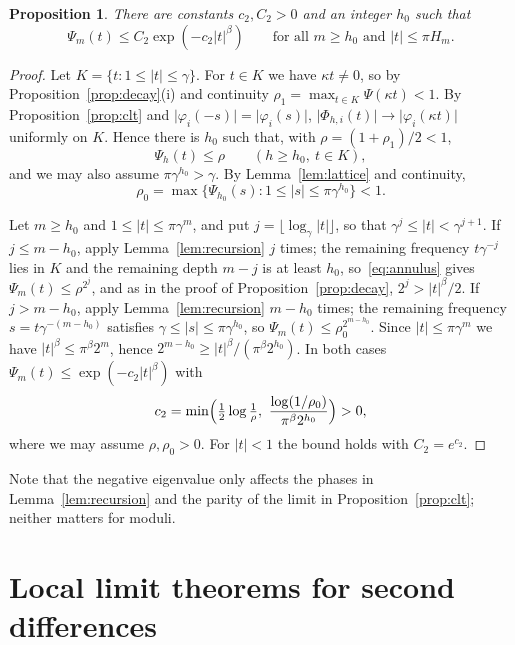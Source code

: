 \documentclass{amsart}
\newtheorem{proposition}[theorem]{Proposition}
\theoremstyle{definition}
\theoremstyle{remark}
\numberwithin{equation}{section}
\newcommand{\abs}[1]{\lvert #1\rvert}
\begin{document}
\begin{proposition}\label{prop:uniformdecay}
There are constants $c_2,C_2>0$ and an integer $h_0$ such that
\[
\Psi_m(t)\le C_2\exp(-c_2\abs t^\beta)\qquad\text{for all } m\ge h_0 \text{ and } \abs t\le\pi H_m .
\]
\end{proposition}

\begin{proof}
Let $K=\{t:1\le\abs t\le\gamma\}$. For $t\in K$ we have $\kappa t\ne0$, so by Proposition~\ref{prop:decay}(i) and continuity $\rho_1=\max_{t\in K}\Psi(\kappa t)<1$. By Proposition~\ref{prop:clt} and $\abs{\varphi_i(-s)}=\abs{\varphi_i(s)}$, $\abs{\Phi_{h,i}(t)}\to\abs{\varphi_i(\kappa t)}$ uniformly on $K$. Hence there is $h_0$ such that, with $\rho=(1+\rho_1)/2<1$,
\begin{equation}\label{eq:annulus}
\Psi_h(t)\le\rho\qquad(h\ge h_0,\ t\in K),
\end{equation}
and we may also assume $\pi\gamma^{h_0}>\gamma$. By Lemma~\ref{lem:lattice} and continuity,
\[
\rho_0=\max\bigl\{\Psi_{h_0}(s):1\le\abs s\le\pi\gamma^{h_0}\bigr\}<1 .
\]

Let $m\ge h_0$ and $1\le\abs t\le\pi\gamma^m$, and put $j=\lfloor\log_\gamma\abs t\rfloor$, so that $\gamma^j\le\abs t<\gamma^{j+1}$. If $j\le m-h_0$, apply Lemma~\ref{lem:recursion} $j$ times; the remaining frequency $t\gamma^{-j}$ lies in $K$ and the remaining depth $m-j$ is at least $h_0$, so~\eqref{eq:annulus} gives $\Psi_m(t)\le\rho^{2^j}$, and as in the proof of Proposition~\ref{prop:decay}, $2^j>\abs t^\beta/2$. If $j>m-h_0$, apply Lemma~\ref{lem:recursion} $m-h_0$ times; the remaining frequency $s=t\gamma^{-(m-h_0)}$ satisfies $\gamma\le\abs s\le\pi\gamma^{h_0}$, so $\Psi_m(t)\le\rho_0^{2^{m-h_0}}$. Since $\abs t\le\pi\gamma^m$ we have $\abs t^\beta\le\pi^\beta2^m$, hence $2^{m-h_0}\ge\abs t^\beta/(\pi^\beta2^{h_0})$. In both cases $\Psi_m(t)\le\exp(-c_2\abs t^\beta)$ with
\[
c_2=\min\Bigl(\tfrac12\log\tfrac1\rho,\ \frac{\log(1/\rho_0)}{\pi^\beta2^{h_0}}\Bigr)>0,
\]
where we may assume $\rho,\rho_0>0$. For $\abs t<1$ the bound holds with $C_2=e^{c_2}$.
\end{proof}

Note that the negative eigenvalue only affects the phases in Lemma~\ref{lem:recursion} and the parity of the limit in Proposition~\ref{prop:clt}; neither matters for moduli.

\section{Local limit theorems for second differences}\label{sec:local}
\end{document}
